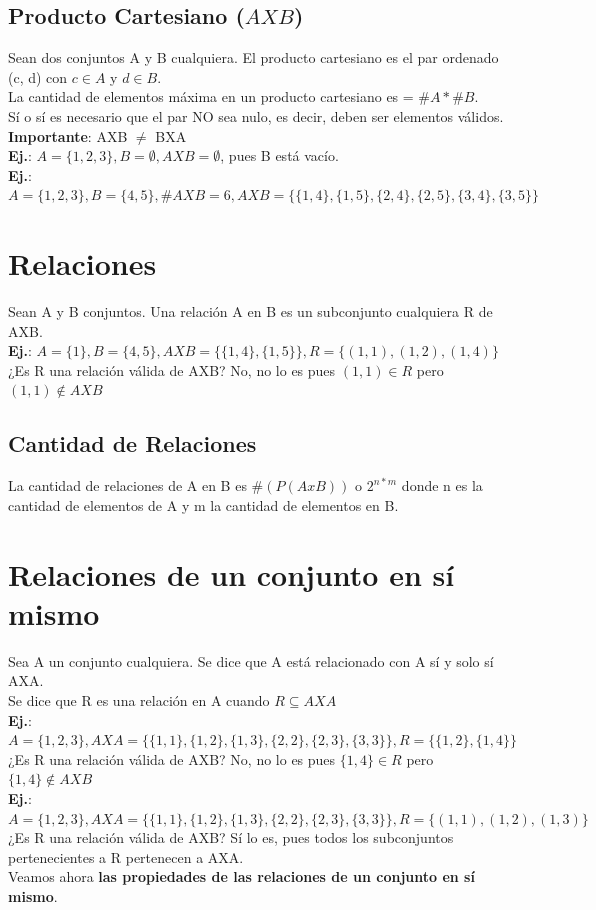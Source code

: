 \documentclass[10pt,a4paper]{article}
\begin{document}
\subsection*{Producto Cartesiano ($A X B$)}
Sean dos conjuntos A y B cualquiera. El producto cartesiano es el par ordenado (c, d) con $c \in A$ y $d \in B$. \\ 
La cantidad de elementos máxima en un producto cartesiano es = $\#A \ast \#B$. \\
Sí o sí es necesario que el par NO sea nulo, es decir, deben ser elementos válidos. \\
\textbf{Importante}: AXB $\neq$ BXA \\
\textbf{Ej.}: $A = \{1, 2, 3\}, B = \emptyset, AXB = \emptyset$, pues B está vacío. \\
\textbf{Ej.}: $A = \{1, 2, 3\}, B = \{4, 5\}, \#AXB = 6, AXB = \{\{1, 4\}, \{1, 5\}, \{2, 4\}, \{2, 5\}, \{3, 4\}, \{3, 5\} \}$
\section*{Relaciones}
Sean A y B conjuntos. Una relación A en B es un subconjunto cualquiera R de AXB. \\
\textbf{Ej.}: $A = \{1\}, B = \{4, 5\}, AXB=\{\{1, 4\}, \{1, 5\}\}, R = \{(1, 1), (1, 2), (1, 4)\}$ ¿Es R una relación válida de AXB? No, no lo es pues $(1, 1) \in R$ pero $ (1, 1) \notin AXB$ \\
\subsection*{Cantidad de Relaciones}
La cantidad de relaciones de A en B es $\#(P(AxB))$ o $ 2^{n \ast m}$ donde n es la cantidad de elementos de A y m la cantidad de elementos en B.
\section*{Relaciones de un conjunto en sí mismo}
Sea A un conjunto cualquiera. Se dice que A está relacionado con A sí y solo sí AXA. \\
Se dice que R es una relación en A cuando $ R \subseteq AXA$ \\
\textbf{Ej.}: $A = \{1, 2, 3\}, AXA=\{\{1, 1\}, \{1, 2\}, \{1, 3\}, \{2, 2\}, \{2, 3\}, \{3, 3\}\}, R = \{\{1, 2\}, \{1, 4\}\}$ ¿Es R una relación válida de AXB? No, no lo es pues $\{1, 4\} \in R$ pero $ \{1, 4\} \notin AXB$ \\
\textbf{Ej.}: $A = \{1, 2, 3\}, AXA=\{\{1, 1\}, \{1, 2\}, \{1, 3\}, \{2, 2\}, \{2, 3\}, \{3, 3\}\}, R = \{(1, 1), (1, 2), (1, 3)\}$ ¿Es R una relación válida de AXB? Sí lo es, pues todos los subconjuntos pertenecientes a R pertenecen a AXA. \\
Veamos ahora \textbf{las propiedades de las relaciones de un conjunto en sí mismo}.
\end{document}
